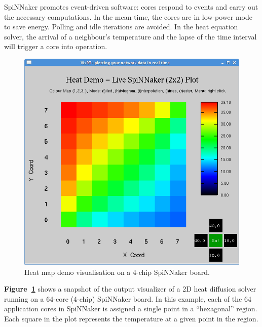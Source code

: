 \documentclass[a4paper, 11pt]{article}
\begin{document}
SpiNNaker promotes event-driven software: cores respond to events and carry out the necessary computations. In the mean time, the cores are in low-power mode to save energy. Polling and idle iterations are avoided. In the heat equation solver, the arrival of a neighbour's temperature and the lapse of the time interval will trigger a core into operation.

\begin{figure}[htbp]
	\centering
	\includegraphics[width=0.6\linewidth]{images/heatmap2x2.png}
	\caption{Heat map demo visualisation on a 4-chip SpiNNaker board.}
	\label{fig:heatmap}
\end{figure}

\textbf{Figure~\ref{fig:heatmap}} shows a snapshot of the output visualizer of a 2D heat diffusion solver running on a 64-core (4-chip) SpiNNaker board. In this example, each of the 64 application cores in SpiNNaker is assigned a single point in a ``hexagonal'' region. Each square in the plot represents the temperature at a given point in the region.

%
%
%
%
\end{document}
